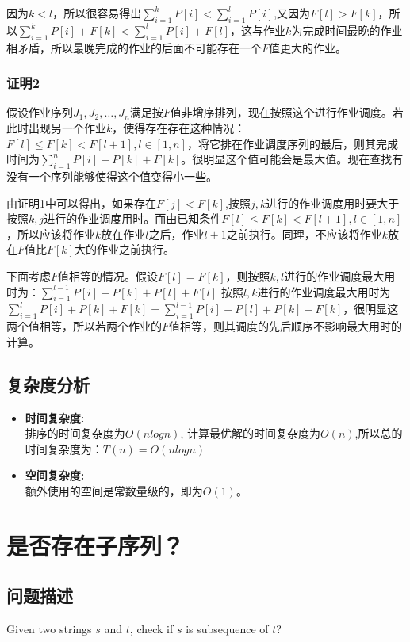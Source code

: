 \documentclass[UTF8,a4paper,12pt]{article}
\begin{document}
\begin{CJK}{UTF8}{gkai}
		因为$ k<l $，所以很容易得出$ \sum_{i=1}^{k}P[i] < \sum_{i=1}^{l}P[i] $,又因为$ F[l]>F[k] $，所以$ \sum_{i=1}^{k}P[i]+F[k] < \sum_{i=1}^{l}P[i]+F[l] $，这与作业$ k $为完成时间最晚的作业相矛盾，所以最晚完成的作业的后面不可能存在一个$ F $值更大的作业。
		
	\subsubsection{证明2}
		假设作业序列$ J_{1} , J_{2} , \dots , J_{n} $满足按$ F $值非增序排列，现在按照这个进行作业调度。若此时出现另一个作业$ k $，使得存在存在这种情况：$ F[l]\le F[k]<F[l+1],l\in[1,n] $，将它排在作业调度序列的最后，则其完成时间为$ \sum_{i=1}^{n}P[i]+P[k]+F[k] $。很明显这个值可能会是最大值。现在查找有没有一个序列能够使得这个值变得小一些。
		
		由证明1中可以得出，如果存在$ F[j]<F[k] $,按照$ j,k $进行的作业调度用时要大于按照$ k,j $进行的作业调度用时。而由已知条件$ F[l]\le F[k]<F[l+1],l\in[1,n] $，所以应该将作业$ k $放在作业$ l $之后，作业$ l+1 $之前执行。同理，不应该将作业$ k $放在$ F $值比$ F[k] $大的作业之前执行。
		
		下面考虑$ F $值相等的情况。假设$ F[l]=F[k] $，则按照$ k,l $进行的作业调度最大用时为：$ \sum_{i=1}^{l-1}P[i]+P[k]+P[l]+F[l] $
		按照$ l,k $进行的作业调度最大用时为$ \sum_{i=1}^{l}P[i]+P[k]+F[k]= \sum_{i=1}^{l-1}P[i]+P[l]+P[k]+F[k]$，很明显这两个值相等，所以若两个作业的$ F $值相等，则其调度的先后顺序不影响最大用时的计算。
		
	\subsection{复杂度分析}		
	\begin{itemize}
		\item{\textbf{时间复杂度:}} \\
		排序的时间复杂度为$ O(nlogn) $, 计算最优解的时间复杂度为$ O(n) $,所以总的时间复杂度为：$T(n)=O(nlogn) $
		\item{\textbf{空间复杂度:}}\\
		额外使用的空间是常数量级的，即为$ O(1) $。
	\end{itemize}
	
	\newpage
	\section{是否存在子序列？}
	\subsection{问题描述}
		Given two strings $ s $ and $ t $, check if $ s $ is subsequence of $ t $?
		

\end{CJK}
\end{document}
